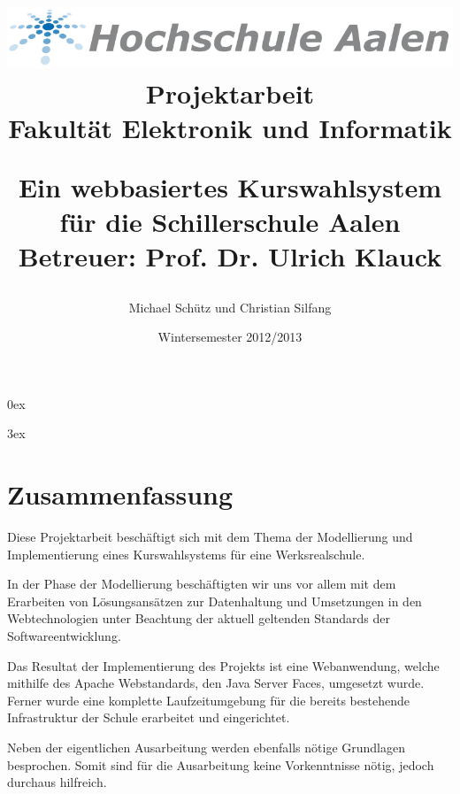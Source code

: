 \documentclass[12pt, twoside, a4paper, ngerman]{article}
\title{
	\begin{center}
		\Huge{\includegraphics[scale=0.5]{img/logo_htw_aalen.png}}\\
		\large{Projektarbeit}\\
		\large{Fakultät Elektronik und Informatik}\\
	\end{center}
	\vspace{3cm}
	\begin{center}
		\Huge{Ein webbasiertes Kurswahlsystem für die Schillerschule Aalen}\\
		\vspace{1.5cm}
		\large{Betreuer: Prof. Dr. Ulrich Klauck}
		\vfill
	\end{center}
}
\author{Michael Schütz und Christian Silfang}
\date{\Huge{Wintersemester 2012/2013}}
\begin{document}
  
	\parindent0ex
	
	\parskip3ex
	
	\newpage
	
	\pagestyle{empty}
	\maketitle
	\thispagestyle{empty}
	\cleardoublepage
	\newpage
	
	\vspace{10cm}
	\section*{Zusammenfassung}
	
\pagestyle{fancy}
	\renewcommand{\sectionmark}[1]{\markboth{#1}{}}
	\fancyhf{}
	\fancyhead[EL]{ { }\leftmark}
	\fancyhead[OR]{\thepage}
	\renewcommand{\headrulewidth}{0.4pt}

Diese Projektarbeit beschäftigt sich mit dem Thema der Modellierung und Implementierung 
eines Kurswahlsystems für eine Werksrealschule.

In der Phase der Modellierung beschäftigten wir uns vor allem mit dem Erarbeiten von Lösungsansätzen zur Datenhaltung und Umsetzungen in den Webtechnologien unter Beachtung der aktuell geltenden Standards der Softwareentwicklung.

Das Resultat der Implementierung des Projekts ist eine Webanwendung, welche mithilfe des Apache Webstandards, den Java Server Faces, umgesetzt wurde.
Ferner wurde eine komplette Laufzeitumgebung für die bereits bestehende Infrastruktur der Schule erarbeitet und eingerichtet.

Neben der eigentlichen Ausarbeitung werden ebenfalls nötige Grundlagen besprochen. Somit sind für die Ausarbeitung keine Vorkenntnisse nötig, jedoch durchaus hilfreich.
	\cleardoublepage
	
	\newpage
	\tableofcontents
	\cleardoublepage
	
	\printnomenclature
	\cleardoublepage
	\pagestyle{fancy}
	\renewcommand{\sectionmark}[1]{\markboth{#1}{}}
	\fancyhf{}
	\fancyhead[EL]{\thesection { }\leftmark}
	\fancyhead[OR]{{ }\rightmark}
	\renewcommand{\headrulewidth}{0.4pt}
	
  	\fancyfoot[EL]{\textbf{\thepage}}
	\fancyfoot[OR]{\textbf{\thepage}} 
% 	
	
\end{document}
